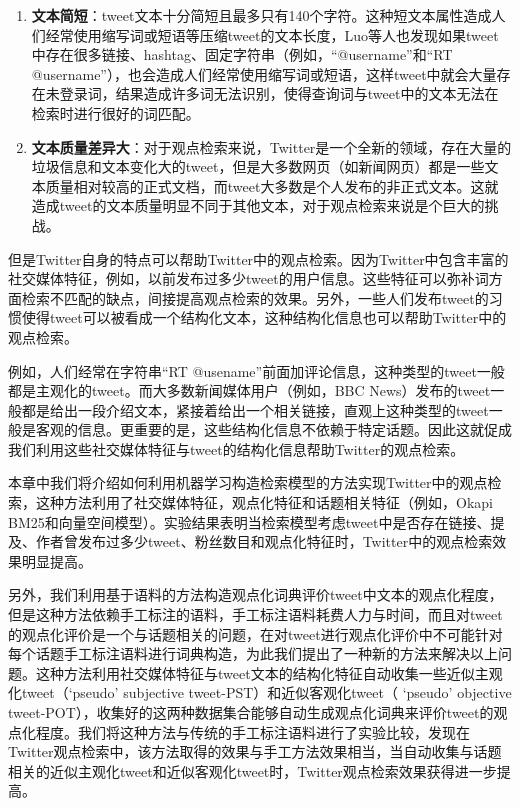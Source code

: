 \begin{enumerate}
\item{\textbf{文本简短}}：tweet文本十分简短且最多只有140个字符。这种短文本属性造成人们经常使用缩写词或短语等压缩tweet的文本长度，Luo等人也发现如果tweet中存在很多链接、hashtag、固定字符串（例如，“@username”和“RT @username”），也会造成人们经常使用缩写词或短语，这样tweet中就会大量存在未登录词，结果造成许多词无法识别，使得查询词与tweet中的文本无法在检索时进行很好的词匹配。
\item{\textbf{文本质量差异大}}：对于观点检索来说，Twitter是一个全新的领域，存在大量的垃圾信息和文本变化大的tweet，但是大多数网页（如新闻网页）都是一些文本质量相对较高的正式文档，而tweet大多数是个人发布的非正式文本。这就造成tweet的文本质量明显不同于其他文本，对于观点检索来说是个巨大的挑战。
\end{enumerate}

但是Twitter自身的特点可以帮助Twitter中的观点检索。因为Twitter中包含丰富的社交媒体特征，例如，以前发布过多少tweet的用户信息。这些特征可以弥补词方面检索不匹配的缺点，间接提高观点检索的效果。另外，一些人们发布tweet的习惯使得tweet可以被看成一个结构化文本，这种结构化信息也可以帮助Twitter中的观点检索。

例如，人们经常在字符串“RT @usename”前面加评论信息，这种类型的tweet一般都是主观化的tweet。而大多数新闻媒体用户（例如，BBC News）发布的tweet一般都是给出一段介绍文本，紧接着给出一个相关链接，直观上这种类型的tweet一般是客观的信息。更重要的是，这些结构化信息不依赖于特定话题。因此这就促成我们利用这些社交媒体特征与tweet的结构化信息帮助Twitter的观点检索。

本章中我们将介绍如何利用机器学习构造检索模型的方法实现Twitter中的观点检索，这种方法利用了社交媒体特征，观点化特征和话题相关特征（例如，Okapi BM25和向量空间模型）。实验结果表明当检索模型考虑tweet中是否存在链接、提及、作者曾发布过多少tweet、粉丝数目和观点化特征时，Twitter中的观点检索效果明显提高。

另外，我们利用基于语料的方法构造观点化词典评价tweet中文本的观点化程度，但是这种方法依赖手工标注的语料，手工标注语料耗费人力与时间，而且对tweet的观点化评价是一个与话题相关的问题，在对tweet进行观点化评价中不可能针对每个话题手工标注语料进行词典构造，为此我们提出了一种新的方法来解决以上问题。这种方法利用社交媒体特征与tweet文本的结构化特征自动收集一些近似主观化tweet（`pseudo' subjective tweet-PST）和近似客观化tweet（ `pseudo' objective tweet-POT），收集好的这两种数据集合能够自动生成观点化词典来评价tweet的观点化程度。我们将这种方法与传统的手工标注语料进行了实验比较，发现在Twitter观点检索中，该方法取得的效果与手工方法效果相当，当自动收集与话题相关的近似主观化tweet和近似客观化tweet时，Twitter观点检索效果获得进一步提高。


